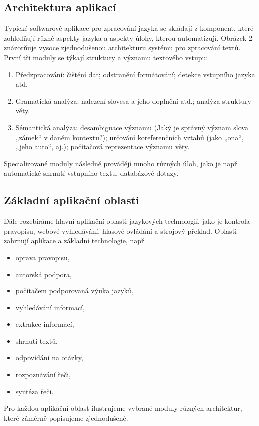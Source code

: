 \documentclass[]{../../metanetpaper}
\begin{document}
\begin{multicols}{2}
\subsection{Architektura aplikací}

Typické softwarové aplikace pro zpracování jazyka se skládají z komponent, které zohledňují různé aspekty jazyka a aspekty úlohy, kterou automatizují. Obrázek 2 znázorňuje vysoce zjednodušenou architekturu systému pro zpracování textů. První tři moduly se týkají struktury a významu textového vstupu:
\begin{enumerate}
  \item Předzpracování: čištění dat; odstranění formátování; detekce vstupního jazyka atd.
  \item Gramatická analýza: nalezení slovesa a jeho doplnění atd.; analýza struktury věty.
  \item Sémantická analýza: desambiguace významu (Jaký je správný význam slova „zámek“ v daném kontextu?); určování koreferenčních vztahů (jako „ona“, „jeho auto“, aj.); počítačová reprezentace významu věty.
\end{enumerate}
Specializované moduly následně provádějí mnoho různých úloh, jako je např. automatické shrnutí vstupního textu, databázové dotazy.

\subsection{Základní aplikační oblasti}

Dále rozebíráme hlavní aplikační oblasti jazykových technologií, jako je kontrola pravopisu, webové vyhledávání, hlasové ovládání a strojový překlad. Oblasti zahrnují aplikace a základní technologie, např.\\
\begin{itemize}
  \item oprava pravopisu,
  \item autorská podpora,
  \item počítačem podporovaná výuka jazyků,
  \item vyhledávání informací,
  \item extrakce informací,
  \item shrnutí textů,
  \item odpovídání na otázky,
  \item rozpoznávání řeči,
  \item syntéza řeči.
\end{itemize}
Pro každou aplikační oblast ilustrujeme vybrané moduly různých architektur, které záměrně popisujeme zjednodušeně.


\end{multicols}
\end{document}
